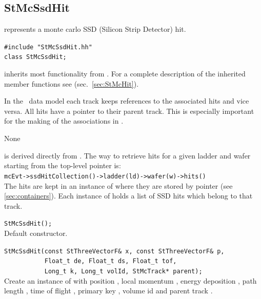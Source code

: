%
%
\subsection{StMcSsdHit}
 
\label{sec:StMcSsdHit}
\begin{Entry}
\item[Summary]
     represents a monte carlo SSD (Silicon Strip Detector) hit.

\item[Synopsis]
    \verb+#include "StMcSsdHit.hh"+\\
    \verb+class StMcSsdHit;+\\

\item[Description]
     inherits most functionality from .
    For a complete description of the inherited member functions see
     (sec.~\ref{sec:StMcHit}).

    In the \StMcEvent\ data model each track keeps references to the
    associated hits and vice versa.  All hits have a pointer to their
    parent track.  This is especially important for the making of the
    associations in \StAssociationMaker.

\item[Persistence]
    None

\item[Related Classes]
     is derived directly from .
    The way to retrieve hits for a given ladder and wafer starting
    from the top-level  pointer is:\\
    \verb+mcEvt->ssdHitCollection()->ladder(ld)->wafer(w)->hits()+\\
    The hits are kept in an instance of 
    where they are stored by pointer (see \ref{sec:containers}).
    Each instance of  holds a list of SSD hits
    which belong to that track.

\item[Public\\ Constructors]
    \verb+StMcSsdHit();+\\
    Default constructor.

    \verb+StMcSsdHit(const StThreeVectorF& x, const StThreeVectorF& p,+\\
    \verb+           Float_t de, Float_t ds, Float_t tof,+\\
    \verb+           Long_t k, Long_t volId, StMcTrack* parent);+\\
    Create an instance of  with position ,
    local momentum , energy deposition , path length
    , time of flight , primary key ,
    volume id  and parent track .


\end{Entry}
